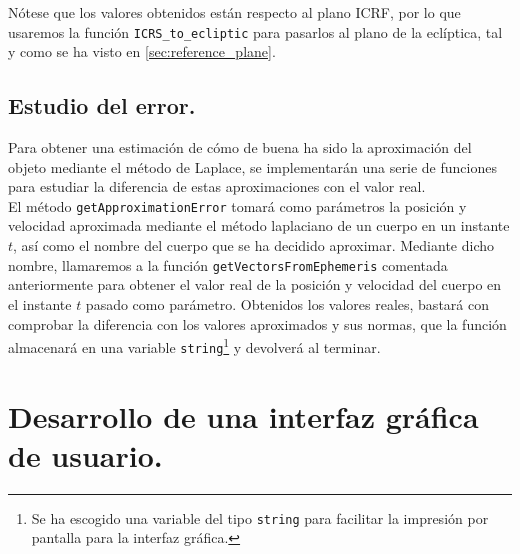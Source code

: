 \documentclass[11pt]{book}
\begin{document}
Nótese que los valores obtenidos están respecto al plano ICRF, por lo que usaremos la función \texttt{ICRS\_to\_ecliptic} para pasarlos al plano de la eclíptica, tal y como se ha visto en \ref{sec:reference_plane}.\\

\subsection{Estudio del error.}
Para obtener una estimación de cómo de buena ha sido la aproximación del objeto mediante el método de Laplace, se implementarán una serie de funciones para estudiar la diferencia de estas aproximaciones con el valor real.\\

El método \texttt{getApproximationError} tomará como parámetros la posición y velocidad aproximada mediante el método laplaciano de un cuerpo en un instante $t$, así como el nombre del cuerpo que se ha decidido aproximar. Mediante dicho nombre, llamaremos a la función \texttt{getVectorsFromEphemeris} comentada anteriormente para obtener el valor real de la posición y velocidad del cuerpo en el instante $t$ pasado como parámetro. Obtenidos los valores reales, bastará con comprobar la diferencia con los valores aproximados y sus normas, que la función almacenará en una variable \texttt{string}\footnote{Se ha escogido una variable del tipo \texttt{string} para facilitar la impresión por pantalla para la interfaz gráfica.} y devolverá al terminar.\\

\section{Desarrollo de una interfaz gráfica de usuario.}

\newpage
\end{document}
